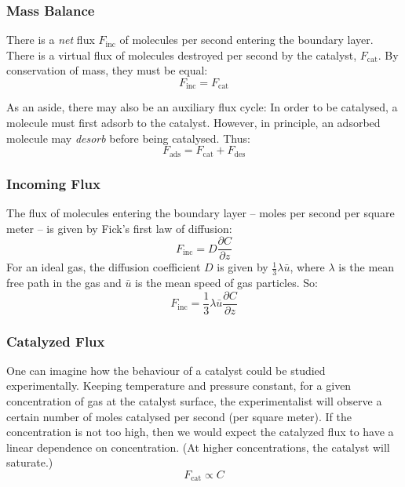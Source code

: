 \documentclass[a4paper]{report}
\newcommand{\Finc}{\ensuremath{F_{\mathrm{inc}}}}
\newcommand{\Fads}{\ensuremath{F_{\mathrm{ads}}}}
\newcommand{\Fdes}{\ensuremath{F_{\mathrm{des}}}}
\newcommand{\Fcat}{\ensuremath{F_{\mathrm{cat}}}}
\begin{document}
\subsubsection*{Mass Balance}
There is a \emph{net} flux $\Finc$ of molecules per second entering the boundary layer.  There is a virtual flux of molecules destroyed per second by the catalyst, $\Fcat$.  By conservation of mass, they must be equal:
\begin{equation}
\Finc = \Fcat
\end{equation}

As an aside, there may also be an auxiliary flux cycle:
In order to be catalysed, a molecule must first adsorb to the catalyst.  However, in principle, an adsorbed molecule may \emph{desorb} before being catalysed.  Thus:
\begin{equation}
\Fads = \Fcat + \Fdes
\end{equation}


\subsubsection*{Incoming Flux}

The flux of molecules entering the boundary layer -- moles per second per square meter -- is given by Fick's first law of diffusion:
\begin{equation}
\Finc = D \frac{\partial C}{\partial z}
\end{equation}
For an ideal gas, the diffusion coefficient $D$ is given by $\frac{1}{3} \lambda \bar{u}$, where $\lambda$ is the mean free path in the gas and $\bar{u}$ is the mean speed of gas particles. So:
\begin{equation}
\Finc = \frac{1}{3} \lambda \bar{u} \frac{\partial C}{\partial z}
\end{equation}

\subsubsection*{Catalyzed Flux}

One can imagine how the behaviour of a catalyst could be studied experimentally.  Keeping temperature and pressure constant, for a given concentration of gas at the catalyst surface, the experimentalist will observe a certain number of moles catalysed per second (per square meter).  If the concentration is not too high, then we would expect the catalyzed flux to have a linear dependence on concentration.  (At higher concentrations, the catalyst will saturate.)
\begin{equation}
\Fcat \propto C 
\end{equation}
\end{document}
